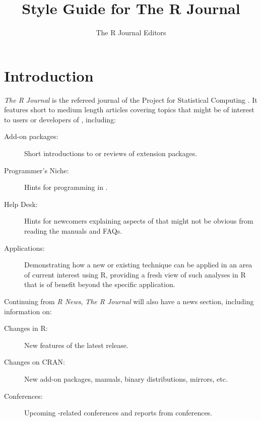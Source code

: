 \title{Style Guide for The R Journal}

\author{The R Journal Editors}

\maketitle


\section{Introduction}

\emph{The R Journal} is the refereed journal of the \R{} Project for Statistical
Computing \citep{R:Ihaka+Gentleman:1996}.
It features short to medium length articles covering topics
that might be of interest to users or developers of \R{}, including:

\begin{description}

\item[Add-on packages:] Short introductions to or reviews of \R{} extension
packages.

\item[Programmer's Niche:] Hints for programming in \R{}.

\item[Help Desk:] Hints for newcomers explaining aspects of \R{} that might
  not be obvious from reading the manuals and FAQs.

\item[Applications:] Demonstrating how a new or existing technique can be
applied in an area of current interest using R, providing a fresh view
of such analyses in R that is of benefit beyond the specific application.

\end{description}

Continuing from \emph{R News}, \emph{The R Journal} will also have a news section,
including information on:

\begin{description}

\item[Changes in R:] New features of the latest release.

\item[Changes on CRAN:] New add-on packages, manuals, binary distributions,
mirrors, etc.

\item[Conferences:] Upcoming \R{}-related conferences and reports from
conferences.

\end{description}

